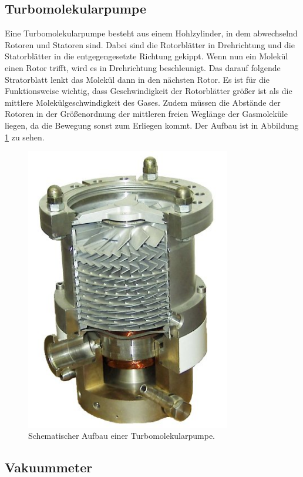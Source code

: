 \subsection{Turbomolekularpumpe}
Eine Turbomolekularpumpe besteht aus einem Hohlzylinder, in dem abwechselnd Rotoren und Statoren sind. Dabei sind die Rotorblätter in Drehrichtung und die
Statorblätter in die entgegengesetzte Richtung gekippt. Wenn nun ein Molekül einen Rotor trifft, wird es in Drehrichtung beschleunigt. Das darauf folgende Stratorblatt lenkt das Molekül dann
in den nächsten Rotor. Es ist für die Funktionsweise wichtig, dass Geschwindigkeit der Rotorblätter größer ist als die mittlere Molekülgeschwindigkeit des
Gases. Zudem müssen die Abstände der Rotoren in der Größenordnung der mittleren freien Weglänge der Gasmoleküle liegen, da die Bewegung sonst zum Erliegen
kommt. Der Aufbau ist in Abbildung \ref{img:turbopump} zu sehen.
\begin{figure}
	\centering
	\includegraphics[width=0.8\textwidth]{img/turbopump.jpg}
	\caption{Schematischer Aufbau einer Turbomolekularpumpe.\cite{wiki}}
	\label{img:turbopump}
\end{figure}
\subsection{Vakuummeter}
